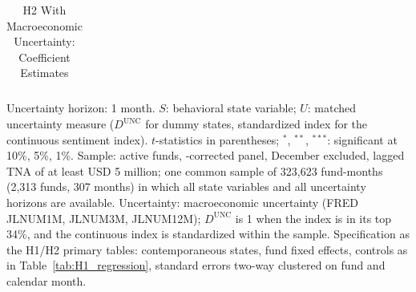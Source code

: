 \begin{table}[!htbp]
{\begin{tabular}{lccc}
\bottomrule
\end{tabular}%
}\sbefit
\setlength{\tabletempwidth}{\wd\tabletempbox}
\ifdim\tabletempwidth>\linewidth\setlength{\tabletempwidth}{\linewidth}\fi
\begin{minipage}{\tabletempwidth}
\captionsetup{width=\linewidth}
\caption{H2 With Macroeconomic Uncertainty: Coefficient Estimates}\label{tab:unc_H2}
\ifdim\wd\tabletempbox>\linewidth
  \resizebox{\linewidth}{!}{\usebox{\tabletempbox}}
\else
  \usebox{\tabletempbox}
\fi
\par\medskip
\begin{singlespace}\tablefont\noindent
Uncertainty horizon: 1 month. $S$: behavioral state variable; $U$: matched uncertainty measure ($D^{\text{UNC}}$ for dummy states, standardized index for the continuous sentiment index). $t$-statistics in parentheses; $^{*}$, $^{**}$, $^{***}$: significant at 10\%, 5\%, 1\%. Sample: active funds, \textcite{Evans2010}-corrected panel, December excluded, lagged TNA of at least USD 5 million; one common sample of 323,623 fund-months (2,313 funds, 307 months) in which all state variables and all uncertainty horizons are available. Uncertainty: \textcite{JuradoLudvigsonNg2015} macroeconomic uncertainty (FRED JLNUM1M, JLNUM3M, JLNUM12M); $D^{\text{UNC}}$ is 1 when the index is in its top 34\%, and the continuous index is standardized within the sample. Specification as the H1/H2 primary tables: contemporaneous states, fund fixed effects, controls as in Table~\ref{tab:H1_regression}, standard errors two-way clustered on fund and calendar month.
\end{singlespace}
\end{minipage}
\end{table}

